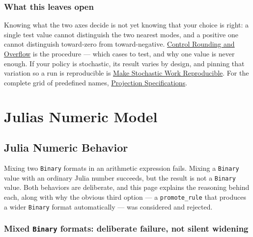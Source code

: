 \subsection{What this leaves open}



\label{15263504601444045058-dup3}{}


Knowing what the two axes decide is not yet knowing that your choice is right: a single test value cannot distinguish the two nearest modes, and a positive one cannot distinguish toward-zero from toward-negative. \href{workflow\_\allowbreak{}rounding\_\allowbreak{}overflow.md}{Control Rounding and Overflow} is the procedure — which cases to test, and why one value is never enough. If your policy is stochastic, its result varies by design, and pinning that variation so a run is reproducible is \href{workflow\_\allowbreak{}stochastic.md}{Make Stochastic Work Reproducible}. For the complete grid of predefined names, \href{reference\_\allowbreak{}projections.md}{Projection Specifications}.



\chapter{Julia{\textquotesingle}s Numeric Model}


\section{Julia Numeric Behavior}



\label{17637359042291997138}{}


Mixing two \texttt{Binary} formats in an arithmetic expression fails. Mixing a \texttt{Binary} value with an ordinary Julia number succeeds, but the result is not a \texttt{Binary} value. Both behaviors are deliberate, and this page explains the reasoning behind each, along with why the obvious third option — a \texttt{promote\_\allowbreak{}rule} that produces a wider \texttt{Binary} format automatically — was considered and rejected.



\subsection{Mixed \texttt{Binary} formats: deliberate failure, not silent widening}



\label{12941061487779548011}{}


